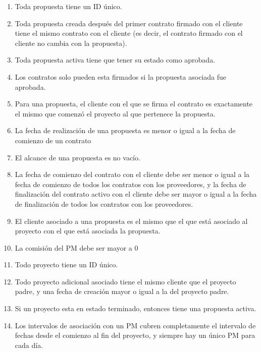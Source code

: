 \documentclass{article}
\theoremstyle{definition}
\theoremstyle{remark}
\begin{document}
\begin{enumerate}
    \item Toda propuesta tiene un ID único.
    \item Toda propuesta creada después del primer contrato firmado con el cliente tiene el mismo contrato con el cliente (es decir, el contrato firmado con el cliente no cambia con la propuesta).
    \item Toda propuesta activa tiene que tener su estado como aprobada.
    \item Los contratos solo pueden esta firmados si la propuesta asociada fue aprobada.
    \item Para una propuesta, el cliente con el que se firma el contrato es exactamente el mismo que comenzó el proyecto al que pertenece la propuesta.
    \item La fecha de realización de una propuesta es menor o igual a la fecha de comienzo de un contrato
    \item El alcance de una propuesta es no vacío.
    \item La fecha de comienzo del contrato con el cliente debe ser menor o igual a la fecha de comienzo de todos los contratos con los proveedores, y la fecha de finalización del contrato activo con el cliente debe ser mayor o igual a la fecha de finalización de todos los contratos con los proveedores.
    \item El cliente asociado a una propuesta es el mismo que el que está asociado al proyecto con el que está asociada la propuesta.
    \item La comisión del PM debe ser mayor a 0
    
    \item Todo proyecto tiene un ID único.
    \item Todo proyecto adicional asociado tiene el mismo cliente que el proyecto padre, y una fecha de creación mayor o igual a la del proyecto padre.
    \item Si un proyecto esta en estado terminado, entonces tiene una propuesta activa.
    \item Los intervalos de asociación con un PM cubren completamente el intervalo de fechas desde el comienzo al fin del proyecto, y siempre hay un único PM para cada día.
    

\end{enumerate}
\end{document}
